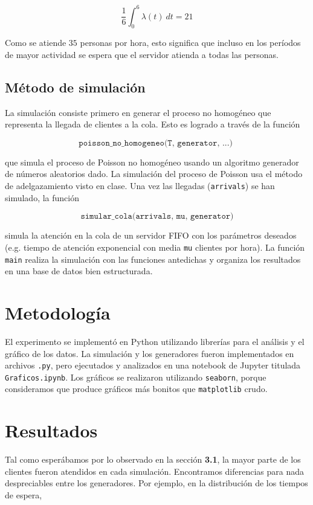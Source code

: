 \documentclass[a4paper, 12pt]{article}
\begin{document}
\begin{equation}
    \frac{1}{6}\int_0^{6}\lambda(t) ~ dt = 21
\end{equation}

Como se atiende $35$ personas por hora, esto significa que incluso en los
períodos de mayor actividad se espera que el servidor atienda a todas las
personas.

\subsection{Método de simulación}

La simulación consiste primero en generar el proceso no homogéneo que representa
la llegada de clientes a la cola. Esto es logrado a través de la función 

\begin{equation*}
    \texttt{poisson\_no\_homogeneo(T, generator, ...) }
\end{equation*}

que simula el proceso de Poisson no homogéneo usando un algoritmo generador de
números aleatorios dado. La simulación del proceso de Poisson usa el método de
adelgazamiento visto en clase. Una vez las llegadas (\texttt{arrivals}) se han simulado, la función

\begin{equation*}
\texttt{simular\_cola(arrivals, mu, generator)}
\end{equation*}

simula la atención en la cola de un servidor FIFO con los parámetros deseados
(e.g. tiempo de atención exponencial con media \texttt{mu} clientes por hora). La función \texttt{main}
realiza la simulación con las funciones antedichas y organiza los resultados en
una base de datos bien estructurada.


\section{Metodología}

El experimento se implementó en Python utilizando librerías para el análisis y
el gráfico de los datos. La simulación y los generadores fueron implementados en
archivos \texttt{.py}, pero ejecutados y analizados en una notebook de Jupyter
titulada \texttt{Graficos.ipynb}. Los gráficos se realizaron utilizando
\texttt{seaborn}, porque consideramos que produce gráficos más bonitos que
\texttt{matplotlib} crudo. 

\section{Resultados}

Tal como esperábamos por lo observado en la sección \textbf{3.1}, la mayor parte
de los clientes fueron atendidos en cada simulación. Encontramos diferencias
para nada despreciables entre los generadores. Por ejemplo, en la distribución
de los tiempos de espera,
\end{document}
